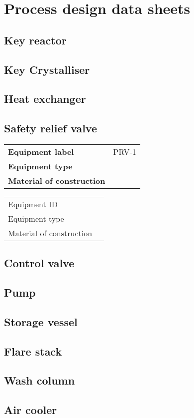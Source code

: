 \section{Process design data sheets}

\subsection{Key reactor}

\subsection{Key Crystalliser}

\subsection{Heat exchanger}

\subsection{Safety relief valve}

\begin{table}[H]
    \centering
    \begin{tabular}{@{}l|l@{}}
    \toprule
      \textbf{Equipment label}  & PRV-1 \\
       \textbf{Equipment type}  &  \\
       \textbf{Material of construction} & \\
       \bottomrule
    \end{tabular}
\end{table}

\begin{table}[H]
    \centering
    \begin{tabular}{@{}l|l@{}}
    \toprule
       Equipment ID  &  \\
       Equipment type  &  \\
       Material of construction & \\
       \bottomrule
    \end{tabular}
\end{table}

\subsection{Control valve}

\subsection{Pump}

\subsection{Storage vessel}

\subsection{Flare stack}

\subsection{Wash column}

\subsection{Air cooler}


